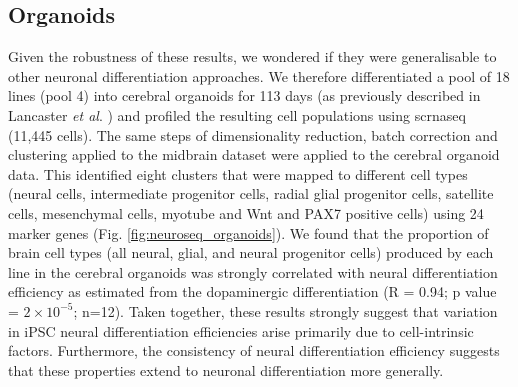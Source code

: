 \subsection{Organoids}
Given the robustness of these results, we wondered if they were generalisable to other neuronal differentiation approaches. 
We therefore differentiated a pool of 18 lines (pool 4) into cerebral organoids for 113 days (as previously described in Lancaster \textit{et al}. \cite{lancaster2017guided}) and profiled the resulting cell populations using \gls{scrnaseq} (11,445 cells). 
The same steps of dimensionality reduction, batch correction and clustering applied to the midbrain dataset were applied to the cerebral organoid data. 
This identified eight clusters that were mapped to different cell types (neural cells, intermediate progenitor cells, radial glial progenitor cells, satellite cells, mesenchymal cells, myotube and Wnt and PAX7 positive cells) using 24 marker genes (Fig. \ref{fig:neuroseq_organoids}).
We found that the proportion of brain cell types (all neural, glial, and neural progenitor cells) produced by each line in the cerebral organoids was strongly correlated with neural differentiation efficiency as estimated from the dopaminergic differentiation (R = 0.94; p value = $2 \times 10^{-5}$; n=12). 
Taken together, these results strongly suggest that variation in iPSC neural differentiation efficiencies arise primarily due to cell-intrinsic factors. 
Furthermore, the consistency of neural differentiation efficiency suggests that these properties extend to neuronal differentiation more generally.

